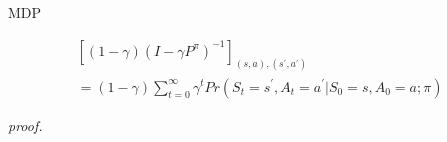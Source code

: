 \documentclass[8pt]{beamer}
\newcommand{\ti}[1]{\textit{#1}}
\begin{document}
\begin{frame}{MDP}
    \begin{lemma}
        \[
        \begin{gathered}
            \left[(1 - \gamma)(I - \gamma P^\pi)^{-1}\right]_{(s,a), (s^\prime, a^\prime)} \\
            = (1 - \gamma) \sum_{t=0}^\infty \gamma^t Pr(S_t=s^\prime, A_t = a^\prime | S_0 =s, A_0 = a; \pi)
        \end{gathered}
        \]
    \end{lemma}

    \ti{proof.}
    
\end{frame}
\end{document}
